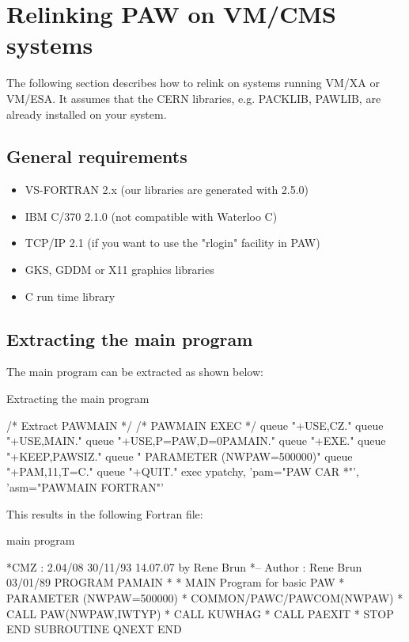 \section{Relinking PAW on VM/CMS systems}

The following section describes how to relink \PAW{}
on systems running VM/XA or VM/ESA. It assumes that the 
CERN libraries, e.g. PACKLIB, PAWLIB, are already installed on
your system.
 
\subsection{General requirements}
 
\begin{itemize}
\item
VS-FORTRAN 2.x    (our libraries are generated with 2.5.0)
\item
IBM C/370  2.1.0  (not compatible with Waterloo C)
\item
TCP/IP 2.1        (if you want to use the "rlogin" facility in PAW)
\item
GKS, GDDM or X11 graphics libraries
\item
C run time library
\end{itemize}


\subsection{Extracting the main program}

The main program can be extracted as shown below:

\begin{XMPt}{Extracting the \PAW{} main program}

/* Extract PAWMAIN */
/* PAWMAIN EXEC    */
queue "+USE,CZ."
queue "+USE,MAIN."
queue "+USE,P=PAW,D=0PAMAIN."
queue "+EXE."
queue "+KEEP,PAWSIZ."
queue "      PARAMETER (NWPAW=500000)"
queue "+PAM,11,T=C."
queue "+QUIT."
exec        ypatchy,
            'pam="PAW CAR *"',
            'asm="PAWMAIN FORTRAN"'

\end{XMPt}

This results in the following Fortran file:

\begin{XMPt}{\PAW{} main program}

*CMZ :  2.04/08 30/11/93  14.07.07  by  Rene Brun
*-- Author :    Rene Brun   03/01/89
      PROGRAM PAMAIN
*
*        MAIN Program for basic PAW
*
      PARAMETER (NWPAW=500000)
*
      COMMON/PAWC/PAWCOM(NWPAW)
*
      CALL PAW(NWPAW,IWTYP)
*
      CALL KUWHAG
*
      CALL PAEXIT
*
      STOP
      END
      SUBROUTINE QNEXT
      END

\end{XMPt}


